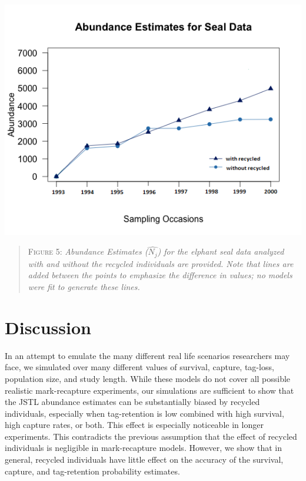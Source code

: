 \documentclass[]{article}
\begin{document}
\includegraphics{RecycledPaper_files/figure-latex/Seals_Abundance.png}

\begin{quote}
\textsc{Figure 5:}
\textsl{Abundance Estimates ($\hat{N_j}$) for the elphant seal data analyzed with and without the recycled individuals are provided. Note that lines are added between the points to emphasize the difference in values; no models were fit to generate these lines.}
\end{quote}

\section{Discussion}\label{discussion}

In an attempt to emulate the many different real life scenarios
researchers may face, we simulated over many different values of
survival, capture, tag-loss, population size, and study length. While
these models do not cover all possible realistic mark-recapture
experiments, our simulations are sufficient to show that the JSTL
abundance estimates can be substantially biased by recycled individuals,
especially when tag-retention is low combined with high survival, high
capture rates, or both. This effect is especially noticeable in longer
experiments. This contradicts the previous assumption that the effect of
recycled individuals is negligible in mark-recapture models. However, we
show that in general, recycled individuals have little effect on the
accuracy of the survival, capture, and tag-retention probability
estimates.
\end{document}
